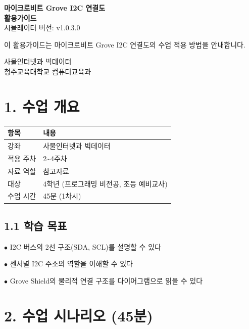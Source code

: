 \documentclass[11pt,a4paper]{article}
\begin{document}
\begin{titlepage}
\centering
\vspace*{3cm}
{\Huge\bfseries\color{primary} 마이크로비트 Grove I2C 연결도}\\[0.5cm]
{\Huge\bfseries\color{primary} 활용가이드}
\\[1.5cm]
{\Large 시뮬레이터 버전: v1.0.3.0}
\\[2cm]
\begin{tcolorbox}[summarybox]
\centering
{\large 이 활용가이드는 마이크로비트 Grove I2C 연결도의 수업 적용 방법을 안내합니다.}
\end{tcolorbox}
\vfill
{\large 사물인터넷과 빅데이터}\\[0.3cm]
{\large 청주교육대학교 컴퓨터교육과}
\vspace{1cm}
\end{titlepage}

\section*{1. 수업 개요}

\begin{center}
\renewcommand{\arraystretch}{1.4}
\begin{tabular}{|p{2.8cm}|p{12.2cm}|}
\hline
\rowcolor{tableheader}
\textbf{항목} & \textbf{내용} \\
\hline
강좌 & 사물인터넷과 빅데이터 \\
\hline
적용 주차 & 2\textasciitilde{}4주차 \\
\hline
자료 역할 & 참고자료 \\
\hline
대상 & 4학년 (프로그래밍 비전공, 초등 예비교사) \\
\hline
수업 시간 & 45분 (1차시) \\
\hline
\end{tabular}
\end{center}

\subsection*{1.1 학습 목표}

$\bullet$ I2C 버스의 2선 구조(SDA, SCL)를 설명할 수 있다

$\bullet$ 센서별 I2C 주소의 역할을 이해할 수 있다

$\bullet$ Grove Shield의 물리적 연결 구조를 다이어그램으로 읽을 수 있다



\section*{2. 수업 시나리오 (45분)}
\end{document}
